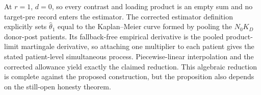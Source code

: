 At \(r=1\), \(d=0\), so every contrast and loading product is an empty sum and no target-pre record enters the estimator.  The corrected estimator definition explicitly sets \(\widehat\theta_1\) equal to the Kaplan--Meier curve formed by pooling the \(N_0K_D\) donor-post patients.  Its fallback-free empirical derivative is the pooled product-limit martingale derivative, so attaching one multiplier to each patient gives the stated patient-level simultaneous process.  Piecewise-linear interpolation and the corrected allowance yield exactly the claimed reduction.  This algebraic reduction is complete against the proposed construction, but the proposition also depends on the still-open honesty theorem.